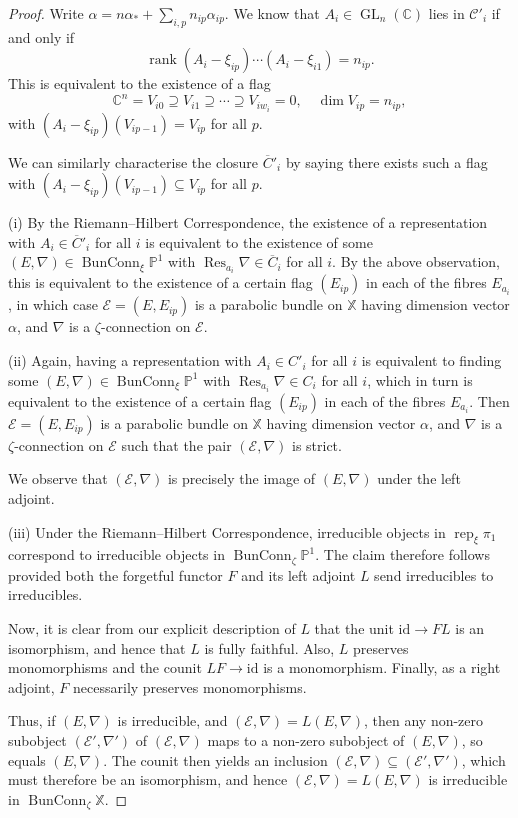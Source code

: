 \documentclass[12pt,a4paper]{amsart}
\theoremstyle{plain}
\newcommand{\C}{\mathbb C}
\newcommand{\PP}{\mathbb P}
\DeclareMathOperator{\rep}{rep}
\DeclareMathOperator{\GL}{GL}
\DeclareMathOperator{\rank}{rank}
\DeclareMathOperator{\Res}{Res}
\DeclareMathOperator{\BunConn}{BunConn}
\newcommand{\E}{\mathcal E}
\newcommand{\XX}{\mathbb X}
\begin{document}
\begin{proof}
Write $\alpha=n\alpha_\ast+\sum_{i,p}n_{ip}\alpha_{ip}$. We know that $A_i\in\GL_n(\C)$ lies in $\mathcal C'_i$ if and only if
\[ \rank(A_i-\xi_{ip})\cdots(A_i-\xi_{i1}) = n_{ip}. \]
This is equivalent to the existence of a flag
\[ \C^n = V_{i0} \supseteq V_{i1} \supseteq \cdots \supseteq V_{iw_i} = 0, \quad \dim V_{ip}=n_{ip}, \]
with $(A_i-\xi_{ip})(V_{ip-1})=V_{ip}$ for all $p$.

We can similarly characterise the closure $\overline C'_i$ by saying there exists such a flag with $(A_i-\xi_{ip})(V_{ip-1})\subseteq V_{ip}$ for all $p$.

(i) By the Riemann--Hilbert Correspondence, the existence of a representation with $A_i\in\overline C'_i$ for all $i$ is equivalent to the existence of some $(E,\nabla)\in\BunConn_\xi\PP^1$ with $\Res_{a_i}\nabla\in\overline C_i$ for all $i$. By the above observation, this is equivalent to the existence of a certain flag $(E_{ip})$ in each of the fibres $E_{a_i}$, in which case $\E=(E,E_{ip})$ is a parabolic bundle on $\XX$ having dimension vector $\alpha$, and $\nabla$ is a $\zeta$-connection on $\E$.

(ii) Again, having a representation with $A_i\in C'_i$ for all $i$ is equivalent to finding some $(E,\nabla)\in\BunConn_\xi\PP^1$ with $\Res_{a_i}\nabla\in C_i$ for all $i$, which in turn is equivalent to the existence of a certain flag $(E_{ip})$ in each of the fibres $E_{a_i}$. Then $\E=(E,E_{ip})$ is a parabolic bundle on $\XX$ having dimension vector $\alpha$, and $\nabla$ is a $\zeta$-connection on $\E$ such that the pair $(\E,\nabla)$ is strict.

We observe that $(\E,\nabla)$ is precisely the image of $(E,\nabla)$ under the left adjoint.

(iii) Under the Riemann--Hilbert Correspondence, irreducible objects in $\rep_\xi\pi_1$ correspond to irreducible objects in $\BunConn_\zeta\PP^1$. The claim therefore follows provided both the forgetful functor $F$ and its left adjoint $L$ send irreducibles to irreducibles.

Now, it is clear from our explicit description of $L$ that the unit $\mathrm{id}\to FL$ is an isomorphism, and hence that $L$ is fully faithful. Also, $L$ preserves monomorphisms and the counit $LF\to\mathrm{id}$ is a monomorphism. Finally, as a right adjoint, $F$ necessarily preserves monomorphisms.

Thus, if $(E,\nabla)$ is irreducible, and $(\E,\nabla)=L(E,\nabla)$, then any non-zero subobject $(\E',\nabla')$ of $(\E,\nabla)$ maps to a non-zero subobject of $(E,\nabla)$, so equals $(E,\nabla)$. The counit then yields an inclusion $(\E,\nabla)\subseteq(\E',\nabla')$, which must therefore be an isomorphism, and hence $(\E,\nabla)=L(E,\nabla)$ is irreducible in $\BunConn_\zeta\XX$.


\end{proof}
\end{document}
